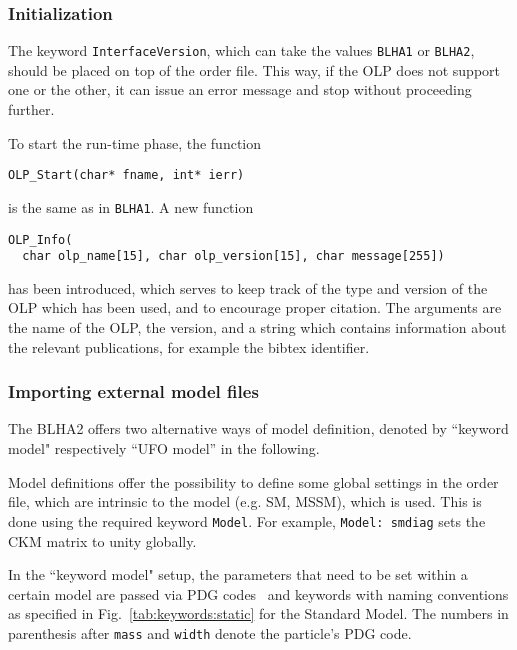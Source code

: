 

\subsubsection{Initialization}
The keyword {\tt InterfaceVersion}, which can take the values
{\tt BLHA1} or {\tt BLHA2}, should be placed on top of the order file. 
This way, if the OLP does not support one or the other, it can issue an error message and stop 
without proceeding further.

To start the run-time phase, the function
\begin{lstlisting}[style=C]
OLP_Start(char* fname, int* ierr)
\end{lstlisting}
is the same  as in {\tt BLHA1}.
A new function
\begin{lstlisting}[style=C]
OLP_Info(
  char olp_name[15], char olp_version[15], char message[255])
\end{lstlisting}
has been introduced,
which serves to keep track of the type and version of the OLP which has been used,
and to encourage proper citation. 
The arguments are the name of the OLP, the version, and a string which  
contains information about
the relevant publications, for example the bibtex identifier.

\subsubsection{Importing external model files}

The BLHA2 offers two alternative ways of model definition, denoted by 
``keyword model" respectively ``UFO model'' in the following.

Model definitions offer the possibility to define some global settings 
in the order file, which are intrinsic to the model (e.g. SM, MSSM), which 
is used.
This is done using the required keyword {\tt Model}.
For example, {\tt Model: smdiag} sets the CKM matrix to unity globally.

In the ``keyword model" setup, 
the parameters that need to be set within a certain model 
are passed via PDG codes~\cite{Beringer:1900zz} and keywords 
with naming
conventions as specified in Fig.~\ref{tab:keywords:static} for the Standard
Model. The numbers in parenthesis after {\tt mass} and {\tt width}  denote
the particle's PDG code.

